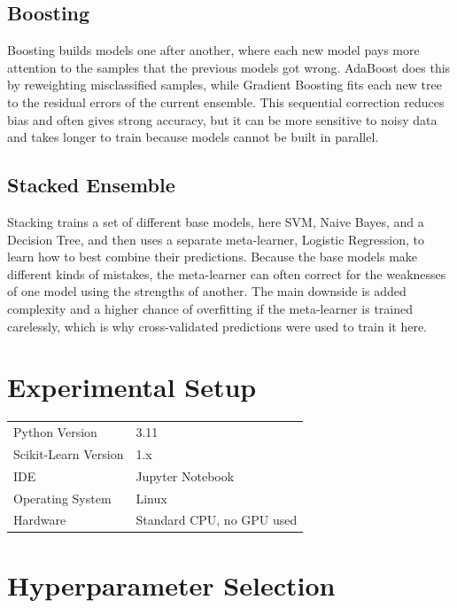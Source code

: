 \documentclass[12pt,a4paper]{article}
\begin{document}
\subsection*{Boosting}
Boosting builds models one after another, where each new model pays more attention to the samples that the previous models got wrong. AdaBoost does this by reweighting misclassified samples, while Gradient Boosting fits each new tree to the residual errors of the current ensemble. This sequential correction reduces bias and often gives strong accuracy, but it can be more sensitive to noisy data and takes longer to train because models cannot be built in parallel.

\subsection*{Stacked Ensemble}
Stacking trains a set of different base models, here SVM, Naive Bayes, and a Decision Tree, and then uses a separate meta-learner, Logistic Regression, to learn how to best combine their predictions. Because the base models make different kinds of mistakes, the meta-learner can often correct for the weaknesses of one model using the strengths of another. The main downside is added complexity and a higher chance of overfitting if the meta-learner is trained carelessly, which is why cross-validated predictions were used to train it here.

\section{Experimental Setup}
\begin{tabular}{ll}
\toprule
Python Version & 3.11 \\
Scikit-Learn Version & 1.x \\
IDE & Jupyter Notebook \\
Operating System & Linux \\
Hardware & Standard CPU, no GPU used \\
\bottomrule
\end{tabular}

\section{Hyperparameter Selection}
\end{document}
